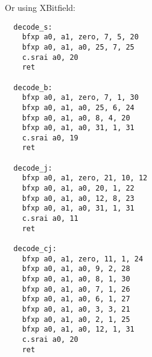 Or using XBitfield:

\begin{multicols}{2}
\begin{verbatim}
  decode_s:
    bfxp a0, a1, zero, 7, 5, 20
    bfxp a0, a1, a0, 25, 7, 25
    c.srai a0, 20
    ret

  decode_b:
    bfxp a0, a1, zero, 7, 1, 30
    bfxp a0, a1, a0, 25, 6, 24
    bfxp a0, a1, a0, 8, 4, 20
    bfxp a0, a1, a0, 31, 1, 31
    c.srai a0, 19
    ret

  decode_j:
    bfxp a0, a1, zero, 21, 10, 12
    bfxp a0, a1, a0, 20, 1, 22
    bfxp a0, a1, a0, 12, 8, 23
    bfxp a0, a1, a0, 31, 1, 31
    c.srai a0, 11
    ret

  decode_cj:
    bfxp a0, a1, zero, 11, 1, 24
    bfxp a0, a1, a0, 9, 2, 28
    bfxp a0, a1, a0, 8, 1, 30
    bfxp a0, a1, a0, 7, 1, 26
    bfxp a0, a1, a0, 6, 1, 27
    bfxp a0, a1, a0, 3, 3, 21
    bfxp a0, a1, a0, 2, 1, 25
    bfxp a0, a1, a0, 12, 1, 31
    c.srai a0, 20
    ret
\end{verbatim}
\end{multicols}
